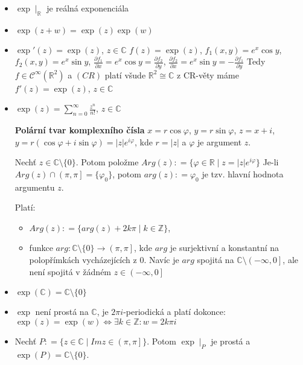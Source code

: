 \begin{properties}
\begin{itemize}
    \item $\exp \mid_{  \mathbb{R}}$ je reálná exponenciála 
    \item $\exp(z+w)=\exp(z)\exp(w)$
    \item $\exp'(z)=\exp(z)$, $ z \in\mathbb{C}$
     \newline
     $f(z)=\exp(z)$, $f_1(x,y)=e^x \cos y$, $ f_2(x,y)=e^x\sin y$, 
     \newline
     $\frac{\partial f_1}{\partial x} = e^x\cos y = \frac{\partial f_2}{\partial y}$, $
     \frac{\partial f_2}{\partial x} = e^x \sin y= - \frac{\partial f_1}{\partial y}$
     \newline Tedy $f\in\mathcal{C}^{\infty}(\mathbb{R}^2)$ a $(CR)$ platí všude $\mathbb{R}^2\cong\mathbb{C}$ z CR-věty máme $f'(z)=\exp(z)$, $z\in\mathbb{C}$
     \item $\exp(z)=\sum_{n=0}^{\infty}\frac{z^n}{n!}$, $z\in\mathbb{C}$
     \newline
     
     \textbf{Polární tvar komplexního čísla}
       $ x=r\cos \varphi$, $
        y=r\sin \varphi$, $
        z=x+i$, $ y=r(\cos \varphi + i \sin \varphi)=\lvert z \rvert e^{i\varphi} $, kde $r=\lvert z \rvert$ a $\varphi$ je argument $z$.
    
     
     \begin{notation}
          Nechť $z\in\mathbb{C}\setminus\{0\}$. Potom položme $Arg(z)\colon=\{\varphi\in\mathbb{R}\mid z=\lvert z \rvert e^{i\varphi}\}$ Je-li $Arg(z) \cap \left (\pi,\pi\right ]=\{\varphi_0\}$, potom $arg(z)\colon=\varphi_0$ je tzv. hlavní hodnota argumentu $z$. 
     \end{notation}
     
         Platí: 
        \begin{itemize}
            \item $Arg(z)\colon = \{arg(z)+2k\pi\mid k\in\mathbb{Z}\}$,
            \item funkce $arg\colon \mathbb {C}\setminus\{0\} \to \left (\pi,\pi\right ]$, kde $arg$ je surjektivní a  konstantní na polopřímkách vycházejících z $0$. Navíc je $arg$ spojitá na $\mathbb {C}\setminus\left (-\infty,0\right ]$, ale není spojitá v žádném $z\in \left (-\infty,0\right ]$
        \end{itemize}

     \item $\exp(\mathbb{C})=\mathbb{C}\setminus\{0\}$ 
     \item $\exp$ 
     není prostá na $\mathbb{C}$, je $2\pi i$-periodická a platí dokonce:
     \newline
    $\exp(z) =\exp(w) \iff\exists k \in\mathbb{Z}\colon w=2k\pi i$
     \item Nechť $P\colon=\{z\in\mathbb{C}\mid Im z \in \left (\pi,\pi\right ]\}$.
     Potom $\exp{}\mid_P$ je prostá a $\exp(P)=\mathbb{C}\setminus\{0\}$.
\end{itemize}
\end{properties}


